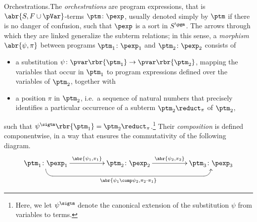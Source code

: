 \documentclass{LMCS}
\begin{document}
\begin{minisection}{Orchestrations.}The \emph{orchestrations} are program expressions, that is \(\abr{S, F \cup \pVar}\)\nb-terms \(\ptm \colon \pexp\), usually denoted simply by \(\ptm\) if there is no danger of confusion, such that \(\pexp\) is a sort in \(S^{\pgm}\).
  The arrows through which they are linked  generalize the subterm relations; in this sense, a \emph{morphism} \(\abr{\psi, \pi}\) between programs \(\ptm_{1} \colon \pexp_{1}\) and \(\ptm_{2} \colon \pexp_{2}\) consists of 
  \begin{itemize}

  \item a substitution \(\psi \colon \pvar\rbr{\ptm_{1}} \to \pvar\rbr{\ptm_{2}}\), mapping the variables that occur in \(\ptm_{1}\) to program expressions defined over the variables of \(\ptm_{2}\), together with

  \item a position \(\pi\) in \(\ptm_{2}\), i.e.\ a sequence of natural numbers that precisely identifies a particular occurrence of a subterm \(\ptm_{2} \reduct_{\pi}\) of \(\ptm_{2}\),

  \end{itemize}
  such that \(\psi^{\sigtm}\rbr{\ptm_{1}} = \ptm_{2} \reduct_{\pi}\).\footnote{Here, we let \(\psi^{\sigtm}\) denote the canonical extension of the substitution \(\psi\) from variables to terms.}
  Their \emph{composition} is defined componentwise, in a way that ensures the commutativity of the following diagram.
  \[
  \xymatrix @C+=5em {
    {\ptm_{1} \colon \pexp_{1}}
    \ar [r] ^-{\abr{\psi_{1}, \pi_{1}}}
    \ar @{->} `d[rr] `[rr]_-{\abr{\psi_{1} \comp \psi_{2}, \pi_{2} \cdot \pi_{1}}} [rr]
    & {\ptm_{2} \colon \pexp_{2}}
    \ar [r] ^-{\abr{\psi_{2}, \pi_{2}}}
    & {\ptm_{3} \colon \pexp_{3}}
  }
  \]
\end{minisection}
\end{document}
